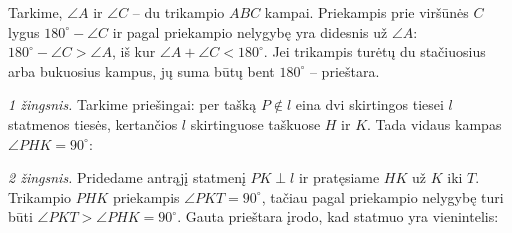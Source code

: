 \documentclass[12pt,a4paper,reqno]{amsart}
\theoremstyle{plain}\newtheorem{theorem}{Teorema}[section]
\theoremstyle{definition}
\theoremstyle{remark}\newtheorem{remark}[theorem]{Pastaba}\newtheorem*{remark*}{Pastaba}
\theoremstyle{definition}\newtheorem*{problem*}{Uždavinys}
\begin{document}
\begin{solution}[\ref{uzd:priekampis-suma}]
Tarkime, $\angle A$ ir $\angle C$ – du trikampio $ABC$ kampai. Priekampis prie viršūnės $C$ lygus $180^\circ-\angle C$ ir pagal priekampio nelygybę yra didesnis už $\angle A$: $180^\circ-\angle C>\angle A$, iš kur $\angle A+\angle C<180^\circ$. Jei trikampis turėtų du stačiuosius arba bukuosius kampus, jų suma būtų bent $180^\circ$ – prieštara.
\end{solution}

\begin{solution}[\ref{atr:statmuo}]
\par\emph{1 žingsnis.} Tarkime priešingai: per tašką $P\notin l$ eina dvi skirtingos tiesei $l$ statmenos tiesės, kertančios $l$ skirtinguose taškuose $H$ ir $K$. Tada vidaus kampas $\angle PHK=90^\circ$:
\begin{center}
\end{center}
\par\emph{2 žingsnis.} Pridedame antrąjį statmenį $PK\perp l$ ir pratęsiame $HK$ už $K$ iki $T$. Trikampio $PHK$ priekampis $\angle PKT=90^\circ$, tačiau pagal priekampio nelygybę turi būti $\angle PKT>\angle PHK=90^\circ$. Gauta prieštara įrodo, kad statmuo yra vienintelis:
\begin{center}
\end{center}
\end{solution}
\end{document}
